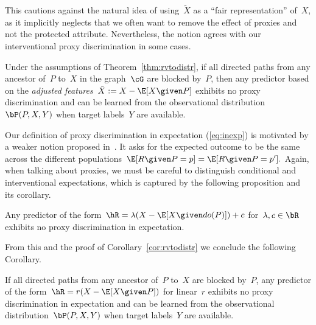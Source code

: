 This cautions against the natural idea of using~$\tilde{X}$ as a ``fair
representation'' of~$X$, as it implicitly neglects that we often want to remove
the effect of proxies and not the protected attribute. Nevertheless, the notion
agrees with our interventional proxy discrimination in some cases.

\begin{corollary}\label{cor:rvtodistr}
  Under the assumptions of Theorem~\ref{thm:rvtodistr}, if all directed paths
  from any ancestor of~$P$ to~$X$ in the graph~$\cG$ are blocked by~$P$, then
  any predictor based on the \emph{adjusted features}~$\tilde{X} := X - \E[X
  \given P]$ exhibits no proxy discrimination and can be learned from the
  observational distribution~$\bP(P, X, Y)$ when target labels~$Y$ are
  available.
\end{corollary}

Our definition of proxy discrimination in expectation (\ref{eq:inexp}) is
motivated by a weaker notion proposed in~\cite{Calders2010}. It asks for the
expected outcome to be the same across the different populations~$\E[R \given
P=p] = \E[R \given P=p'].$ Again, when talking about proxies, we must be careful
to distinguish conditional and interventional expectations, which is captured by
the following proposition and its corollary.

\begin{proposition}\label{pro:inexpectation}
  Any predictor of the form~$\hR = \lambda (X - \E[X \given do(P)]) + c$
  for~$\lambda, c \in \bR$ exhibits no proxy discrimination in expectation.
\end{proposition}

From this and the proof of Corollary~\ref{cor:rvtodistr} we conclude the
following Corollary.

\begin{corollary}
  If all directed paths from any ancestor of~$P$ to~$X$ are blocked by~$P$, any
  predictor of the form~$\hR = r(X - \E[X \given P])$ for linear~$r$ exhibits no
  proxy discrimination in expectation and can be learned from the observational
  distribution~$\bP(P, X, Y)$ when target labels~$Y$ are available.
\end{corollary}
